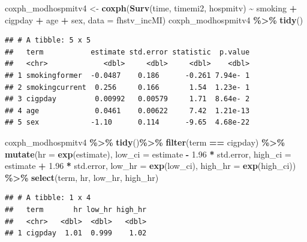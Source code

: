 \documentclass[
]{book}
\newenvironment{Shaded}{\begin{snugshade}}{\end{snugshade}}
\newcommand{\AttributeTok}[1]{\textcolor[rgb]{0.13,0.29,0.53}{#1}}
\newcommand{\FloatTok}[1]{\textcolor[rgb]{0.00,0.00,0.81}{#1}}
\newcommand{\FunctionTok}[1]{\textcolor[rgb]{0.13,0.29,0.53}{\textbf{#1}}}
\newcommand{\NormalTok}[1]{#1}
\newcommand{\OtherTok}[1]{\textcolor[rgb]{0.56,0.35,0.01}{#1}}
\newcommand{\SpecialCharTok}[1]{\textcolor[rgb]{0.81,0.36,0.00}{\textbf{#1}}}
\newcommand{\StringTok}[1]{\textcolor[rgb]{0.31,0.60,0.02}{#1}}
\begin{document}
\begin{Shaded}
\begin{Highlighting}[]
\NormalTok{coxph\_modhospmitv4 }\OtherTok{\textless{}{-}} \FunctionTok{coxph}\NormalTok{(}\FunctionTok{Surv}\NormalTok{(time, timemi2, hospmitv) }\SpecialCharTok{\textasciitilde{}} 
\NormalTok{                              smoking }\SpecialCharTok{+}\NormalTok{ cigpday }\SpecialCharTok{+}\NormalTok{ age }\SpecialCharTok{+}\NormalTok{ sex, }
                            \AttributeTok{data =}\NormalTok{ fhstv\_incMI)}
\NormalTok{coxph\_modhospmitv4 }\SpecialCharTok{\%\textgreater{}\%}
  \FunctionTok{tidy}\NormalTok{()}
\end{Highlighting}
\end{Shaded}

\begin{verbatim}
## # A tibble: 5 x 5
##   term           estimate std.error statistic  p.value
##   <chr>             <dbl>     <dbl>     <dbl>    <dbl>
## 1 smokingformer  -0.0487    0.186      -0.261 7.94e- 1
## 2 smokingcurrent  0.256     0.166       1.54  1.23e- 1
## 3 cigpday         0.00992   0.00579     1.71  8.64e- 2
## 4 age             0.0461    0.00622     7.42  1.21e-13
## 5 sex            -1.10      0.114      -9.65  4.68e-22
\end{verbatim}

\begin{Shaded}
\begin{Highlighting}[]
\NormalTok{coxph\_modhospmitv4 }\SpecialCharTok{\%\textgreater{}\%} 
  \FunctionTok{tidy}\NormalTok{()}\SpecialCharTok{\%\textgreater{}\%} 
  \FunctionTok{filter}\NormalTok{(term }\SpecialCharTok{==} \StringTok{\textquotesingle{}cigpday\textquotesingle{}}\NormalTok{) }\SpecialCharTok{\%\textgreater{}\%}
  \FunctionTok{mutate}\NormalTok{(}\AttributeTok{hr =} \FunctionTok{exp}\NormalTok{(estimate),}
         \AttributeTok{low\_ci =}\NormalTok{ estimate }\SpecialCharTok{{-}} \FloatTok{1.96} \SpecialCharTok{*}\NormalTok{ std.error, }
         \AttributeTok{high\_ci =}\NormalTok{ estimate }\SpecialCharTok{+} \FloatTok{1.96} \SpecialCharTok{*}\NormalTok{ std.error, }
         \AttributeTok{low\_hr =} \FunctionTok{exp}\NormalTok{(low\_ci), }
         \AttributeTok{high\_hr =} \FunctionTok{exp}\NormalTok{(high\_ci)) }\SpecialCharTok{\%\textgreater{}\%} 
  \FunctionTok{select}\NormalTok{(term, hr, low\_hr, high\_hr)}
\end{Highlighting}
\end{Shaded}

\begin{verbatim}
## # A tibble: 1 x 4
##   term       hr low_hr high_hr
##   <chr>   <dbl>  <dbl>   <dbl>
## 1 cigpday  1.01  0.999    1.02
\end{verbatim}
\end{document}
